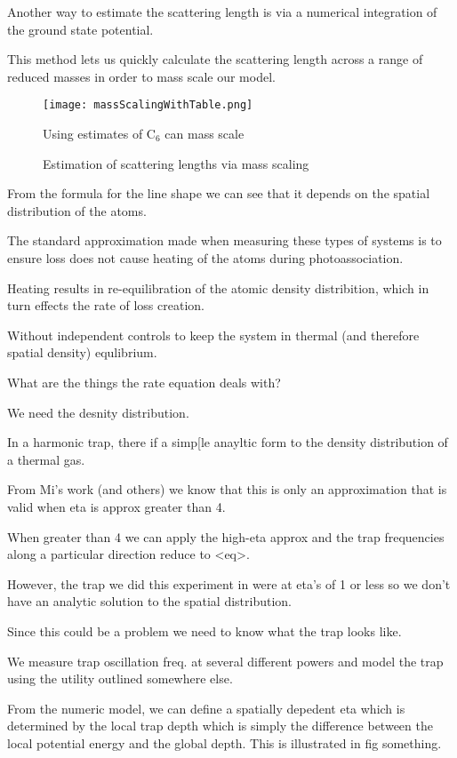 Another way to estimate the scattering length is via a numerical integration of the ground state potential.

This method lets us quickly calculate the scattering length across a range of reduced masses in order to mass scale our model.

	\begin{figure} 
	\centerline{
	  \texttt{[image: massScalingWithTable.png]}}
	  \caption{Estimation of scattering lengths via mass scaling}{Using estimates of C$_6$ can mass scale }
	  \label{fig:massScaling}
	\end{figure}

From the formula for the line shape we can see that it depends on the spatial distribution of the atoms.

The standard approximation made when measuring these types of systems is to ensure loss does not cause heating of the atoms during photoassociation. 

Heating results in re-equilibration of the atomic density distribition, which in turn effects the rate of loss creation. 

Without independent controls to keep the system in thermal (and therefore spatial density) equlibrium.

What are the things the rate equation deals with?

We need the desnity distribution.

In a harmonic trap, there if a simp[le anayltic form to the density distribution of a thermal gas. 

From Mi's work (and others) we know that this is only an approximation that is valid when eta is approx greater than 4. 

When greater than 4 we can apply the high-eta approx and the trap frequencies along a particular direction reduce to <eq>.

However, the trap we did this experiment in were at eta's of 1 or less so we don't have an analytic solution to the spatial distribution.

Since this could be a problem we need to know what the trap looks like.

We measure trap oscillation freq. at several different powers and model the trap using the utility outlined somewhere else.

From the numeric model, we can define a spatially depedent eta which is determined by the local trap depth which is simply the difference between the local potential energy and the global depth.
This is illustrated in fig something.

